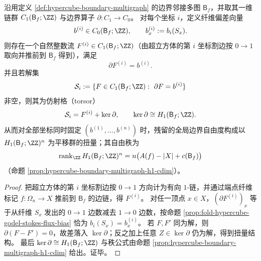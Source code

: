\begin{proposition}\label{prop:fold-hypercube-godel-hodge-torsor}
沿用定义 \ref{def:hypercube-boundary-multigraph} 的边界邻接多图 \(\mathsf B_f\)，并取其一维链群 \(C_1(\mathsf B_f;\ZZ)\) 与边界算子 \(\partial:C_1\to C_0\)。
对每个坐标 \(i\)，定义纤维偏差向量
\[
b^{(i)}\in C_0(\mathsf B_f;\ZZ),
\qquad
b^{(i)}_x:=b_i(S_x).
\]
则存在一个自然整数流 \(F^{(i)}\in C_1(\mathsf B_f;\ZZ)\)（由超立方体的第 \(i\) 坐标割边按 \(0\to 1\) 取向并推前到 \(\mathsf B_f\) 得到），满足
\[
\partial F^{(i)}=b^{(i)}.
\]
并且若解集
\[
\mathcal S_i:=\{F\in C_1(\mathsf B_f;\ZZ):\ \partial F=b^{(i)}\}
\]
非空，则其为仿射格（torsor）
\[
\mathcal S_i=F^{(i)}+\ker\partial,
\qquad
\ker\partial\cong H_1(\mathsf B_f;\ZZ).
\]
从而对全部坐标同时固定 \((b^{(1)},\dots,b^{(n)})\) 时，残留的全局边界自由度构成以 \(H_1(\mathsf B_f;\ZZ)^n\) 为平移群的扭量；其自由秩为
\[
\operatorname{rank}_{\ZZ}H_1(\mathsf B_f;\ZZ)^n
=n\bigl(A(f)-|X|+c(\mathsf B_f)\bigr)
\]
（命题 \ref{prop:hypercube-boundary-multigraph-h1-cdim}）。
\end{proposition}
\begin{proof}
把超立方体的第 \(i\) 坐标割边按 \(0\to 1\) 方向计为有向 \(1\)-链，并通过端点纤维标记 \(f:\Omega_n\to X\) 推前到 \(\mathsf B_f\) 的边链，得 \(F^{(i)}\)。
对任一顶点 \(x\in X\)，\((\partial F^{(i)})_x\) 等于从纤维 \(S_x\) 发出的 \(0\to 1\) 边数减去 \(1\to 0\) 边数，按命题 \ref{prop:fold-hypercube-godel-stokes-flux-bias} 恰为 \(b_i(S_x)=b_x^{(i)}\)。
若 \(F,F'\) 同为解，则 \(\partial(F-F')=0\)，故差落入 \(\ker\partial\)；反之加上任意 \(Z\in\ker\partial\) 仍为解，得到扭量结构。
最后 \(\ker\partial\cong H_1(\mathsf B_f;\ZZ)\) 与秩公式由命题 \ref{prop:hypercube-boundary-multigraph-h1-cdim} 给出。证毕。
\end{proof}

